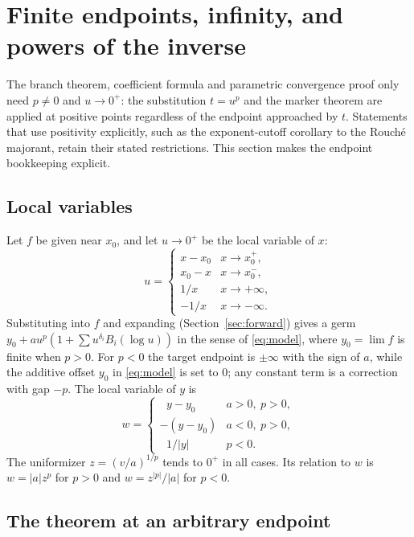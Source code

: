 \section{Finite endpoints, infinity, and powers of the inverse}
\label{sec:endpoints}

The branch theorem, coefficient formula and parametric convergence proof only need $p\ne0$ and $u\to0^+$: the substitution $t=u^p$ and the marker theorem are applied at positive points regardless of the endpoint approached by $t$. Statements that use positivity explicitly, such as the exponent-cutoff corollary to the Rouch\'e majorant, retain their stated restrictions. This section makes the endpoint bookkeeping explicit.

\subsection{Local variables}

Let $f$ be given near $x_0$, and let $u\to0^+$ be the local variable of $x$:
\begin{equation}
 u=\begin{cases}x-x_0 & x\to x_0^+,\\ x_0-x & x\to x_0^-,\\ 1/x & x\to+\infty,\\ -1/x & x\to-\infty .\end{cases}
 \label{eq:local-u}
\end{equation}
Substituting into $f$ and expanding (Section~\ref{sec:forward}) gives a germ $y_0+au^p(1+\sum u^{\delta_i}B_i(\log u))$ in the sense of \eqref{eq:model}, where $y_0=\lim f$ is finite when $p>0$. For $p<0$ the target endpoint is $\pm\infty$ with the sign of $a$, while the additive offset $y_0$ in \eqref{eq:model} is set to $0$; any constant term is a correction with gap $-p$. The local variable of $y$ is
\begin{equation}
 w=\begin{cases}\ \ \,y-y_0 & a>0,\ p>0,\\ -(y-y_0) & a<0,\ p>0,\\ \ \ \,1/|y| & p<0 .\end{cases}
 \label{eq:local-w}
\end{equation}
The uniformizer $z=(v/a)^{1/p}$ tends to $0^+$ in all cases. Its relation to $w$ is $w=|a|z^p$ for $p>0$ and $w=z^{|p|}/|a|$ for $p<0$.

\subsection{The theorem at an arbitrary endpoint}

